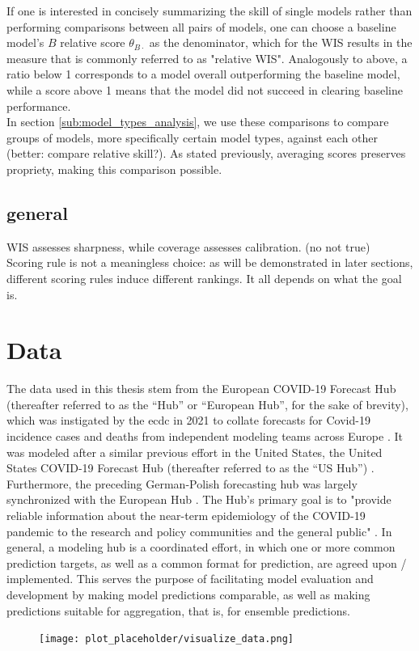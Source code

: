 If one is interested in concisely summarizing the skill of single models rather than performing comparisons between all pairs of models, one can choose a baseline model's $B$ relative score $\theta_{B\cdot}$ as the denominator, which for the WIS results in the measure that is commonly referred to as "relative WIS". Analogously to above, a ratio below 1 corresponds to a model overall outperforming the baseline model, while a score above 1 means that the model did not succeed in clearing baseline performance.\\
In section \ref{sub:model_types_analysis}, we use these comparisons to compare groups of models, more specifically certain model types, against each other (better: compare relative skill?). As stated previously, averaging scores preserves propriety, making this comparison possible.
\subsection{general}
WIS assesses sharpness, while coverage assesses calibration. (no not true)\\
Scoring rule is not a meaningless choice: as will be demonstrated in later sections, different scoring rules induce different rankings. It all depends on what the goal is.
\section{Data}
The data used in this thesis stem from the European COVID-19 Forecast Hub (thereafter referred to as the ``Hub'' or ``European Hub'', for the sake of brevity), which was instigated by the \ac{ecdc} in 2021 to collate forecasts for Covid-19 incidence cases and deaths from independent modeling teams across Europe \citep{european_covid-19_forecast_hub_european_2021}. It was modeled after a similar previous effort in the United States, the United States COVID-19 Forecast Hub (thereafter referred to as the ``US Hub'') \citep{cramer_united_2021}. Furthermore, the preceding German-Polish forecasting hub was largely synchronized with the European Hub \citep{bracher_german_2020}. The Hub's primary goal is to "provide reliable information about the near-term epidemiology of the COVID-19 pandemic to the research and policy communities and the general public" \citep{sherratt_predictive_2022}. In general, a modeling hub is a coordinated effort, in which one or more common prediction targets, as well as a common format for prediction, are agreed upon / implemented. This serves the purpose of facilitating model evaluation and development by making model predictions comparable, as well as making predictions suitable for aggregation, that is, for ensemble predictions. \\
\begin{figure}
\texttt{[image: plot\_placeholder/visualize\_data.png]}
\end{figure}

